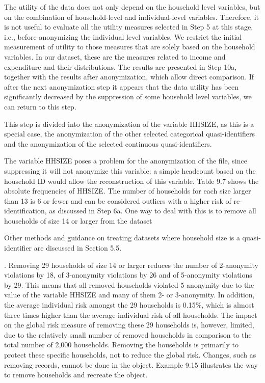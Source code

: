 \documentclass[letterpaper,10pt,english]{sphinxmanual}
\begin{document}
The utility of the data does not only depend on the household level
variables, but on the combination of household-level and
individual-level variables. Therefore, it is not useful to evaluate all
the utility measures selected in Step 5 at this stage, i.e., before
anonymizing the individual level variables. We restrict the initial
measurement of utility to those measures that are solely based on the
household variables. In our dataset, these are the measures related to
income and expenditure and their distributions. The results are
presented in Step 10a, together with the results after anonymization,
which allow direct comparison. If after the next anonymization step it
appears that the data utility has been significantly decreased by the
suppression of some household level variables, we can return to this
step.


This step is divided into the anonymization of the variable HHSIZE, as
this is a special case, the anonymization of the other selected
categorical quasi-identifiers and the anonymization of the selected
continuous quasi-identifiers.


The variable HHSIZE poses a problem for the anonymization of the file,
since suppressing it will not anonymize this variable: a simple
headcount based on the household ID would allow the reconstruction of
this variable. Table 9.7 shows the absolute frequencies of HHSIZE. The
number of households for each size larger than 13 is 6 or fewer and can
be considered outliers with a higher risk of re-identification, as
discussed in Step 6a. One way to deal with this is to remove all
households of size 14 or larger from the dataset %
\begin{footnote}[1]\sphinxAtStartFootnote
Other methods and guidance on treating datasets where household size
is a quasi-identifier are discussed in Section 5.5.
%
\end{footnote}.
Removing 29 households of size 14 or larger reduces the number of
2-anonymity violations by 18, of 3-anonymity violations by 26 and of
5-anonymity violations by 29. This means that all removed households
violated 5-anonymity due to the value of the variable HHSIZE and many of
them 2- or 3-anonymity. In addition, the average individual risk amongst
the 29 households is 0.15\%, which is almost three times higher than the
average individual risk of all households. The impact on the global risk
measure of removing these 29 households is, however, limited, due to the
relatively small number of removed households in comparison to the total
number of 2,000 households. Removing the households is primarily to
protect these specific households, not to reduce the global risk.
 Changes, such as removing records, cannot be done in the
 object. Example 9.15 illustrates the way to remove households
and recreate the  object.
\end{document}
